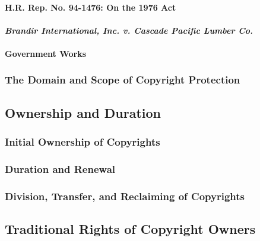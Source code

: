 
\paragraph{H.R. Rep. No. 94-1476: On the 1976 Act}


\paragraph{\emph{Brandir International, Inc. v. Cascade Pacific Lumber Co.}}


\paragraph{Government Works}



\subsubsection{The Domain and Scope of Copyright Protection}


\subsection{Ownership and Duration}


\subsubsection{Initial Ownership of Copyrights}


\subsubsection{Duration and Renewal}


\subsubsection{Division, Transfer, and Reclaiming of Copyrights}


\subsection{Traditional Rights of Copyright Owners}


